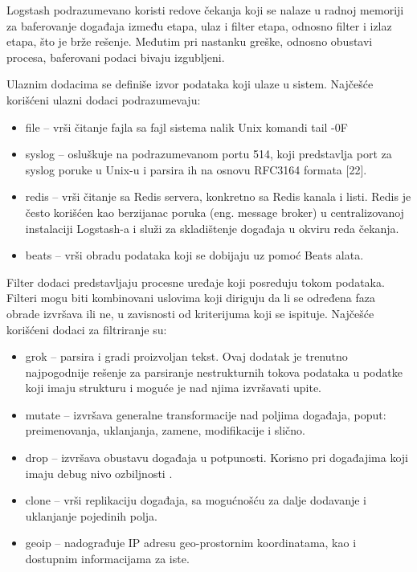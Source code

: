 \par
Logstash podrazumevano koristi redove čekanja koji se nalaze u radnoj memoriji za baferovanje događaja između etapa, ulaz i filter etapa, odnosno filter i izlaz etapa, što je brže rešenje. Međutim pri nastanku greške, odnosno obustavi procesa, baferovani podaci bivaju izgubljeni.

\par
Ulaznim dodacima se definiše izvor podataka koji ulaze u sistem. Najčešće korišćeni ulazni dodaci podrazumevaju:
\begin{itemize}
\item file – vrši čitanje fajla sa fajl sistema nalik Unix komandi tail -0F
\item syslog – osluškuje na podrazumevanom portu 514, koji predstavlja port za syslog poruke u Unix-u i parsira ih na osnovu RFC3164 formata [22].
\item redis – vrši čitanje sa Redis servera, konkretno sa Redis kanala i listi. Redis je često korišćen kao berzijanac poruka (eng. message broker) u centralizovanoj instalaciji Logstash-a i služi za skladištenje događaja u okviru reda čekanja.
\item beats – vrši obradu podataka koji se dobijaju uz pomoć Beats alata.
\end{itemize}

\par
Filter dodaci predstavljaju procesne uređaje koji posreduju tokom podataka. Filteri mogu biti kombinovani uslovima koji diriguju da li se određena faza obrade izvršava ili ne, u zavisnosti od kriterijuma koji se ispituje. Najčešće korišćeni dodaci za filtriranje su:
\begin{itemize}
\item grok – parsira i gradi proizvoljan tekst. Ovaj dodatak je trenutno najpogodnije rešenje za parsiranje nestrukturnih tokova podataka u podatke koji imaju strukturu i moguće je nad njima izvršavati upite.
\item mutate – izvršava generalne transformacije nad poljima događaja, poput: preimenovanja, uklanjanja, zamene, modifikacije i slično.
\item drop – izvršava obustavu događaja u potpunosti. Korisno pri događajima koji imaju debug nivo ozbiljnosti .
\item clone – vrši replikaciju događaja, sa mogućnošću za dalje dodavanje i uklanjanje pojedinih polja.
\item geoip – nadograđuje IP adresu geo-prostornim koordinatama, kao i dostupnim informacijama za iste.
\end{itemize}

